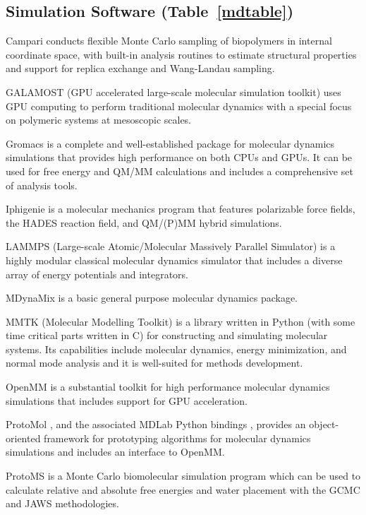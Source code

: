 \subsection*{Simulation Software (Table~\ref{mdtable})}

Campari \cite{Vitalis_2009} conducts flexible Monte Carlo sampling of biopolymers in internal coordinate space, with built-in analysis routines to estimate structural properties and support for replica exchange and Wang-Landau sampling.

GALAMOST (GPU accelerated large-scale molecular simulation toolkit) \cite{Zhu_2013} uses GPU computing to perform traditional molecular dynamics with a special focus on polymeric systems at mesoscopic scales.

Gromacs \cite{Pronk_2013} is a complete and well-established package for molecular dynamics simulations that provides high performance on both CPUs and GPUs.  It can be used for free energy and QM/MM calculations and includes a comprehensive set of analysis tools.

Iphigenie \cite{Lorenzen_2012} is a molecular mechanics program that features polarizable force fields, the HADES reaction field, and QM/(P)MM hybrid simulations.

LAMMPS  (Large-scale Atomic/Molecular Massively Parallel Simulator) \cite{Plimpton_1995} is a highly modular classical molecular dynamics simulator that includes a diverse array of energy potentials and integrators.

MDynaMix \cite{Lyubartsev_2000} is a basic general purpose molecular dynamics package.

MMTK (Molecular Modelling Toolkit) \cite{Hinsen_2000} is a library written in Python (with some time critical parts written in C) for constructing and simulating molecular systems.  Its capabilities include molecular dynamics, energy minimization, and normal mode analysis and it is well-suited for methods development.

OpenMM  \cite{Eastman_2013} is a substantial toolkit for high performance molecular dynamics simulations that includes support for GPU acceleration.

ProtoMol \cite{Matthey_2004}, and the associated MDLab Python bindings \cite{Cickovski_2009}, provides an object-oriented framework for prototyping algorithms for molecular dynamics simulations and includes an interface to OpenMM.

ProtoMS \cite{Michel_2006} is a Monte Carlo biomolecular simulation program which can be used to calculate relative and absolute free energies and water placement with the GCMC and JAWS methodologies.

